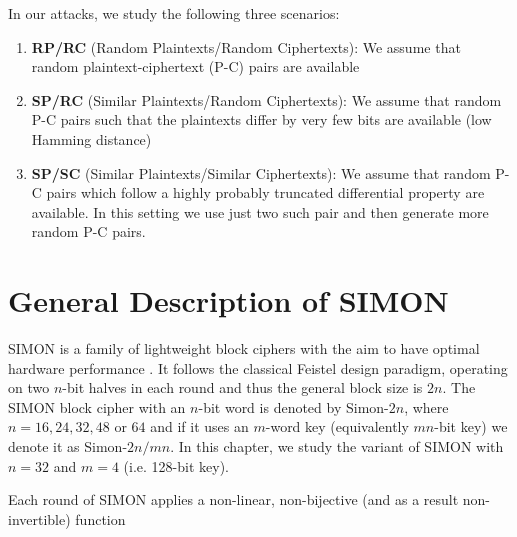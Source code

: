 In our attacks, we study the following three scenarios:

\begin{enumerate}
	\item \textbf{RP/RC} (Random Plaintexts/Random Ciphertexts): We assume that random plaintext-ciphertext (P-C) pairs are available
	\item \textbf{SP/RC} (Similar Plaintexts/Random Ciphertexts): We assume that random P-C pairs such that the plaintexts differ by very few bits
	are available (low Hamming distance)
	\item \textbf{SP/SC} (Similar Plaintexts/Similar Ciphertexts): We assume that random P-C pairs which follow a highly probably truncated differential property are available. In this setting we use just two such pair and then generate more random P-C pairs.
	
	
\end{enumerate}



\section{General Description of SIMON}

SIMON is a family of lightweight block ciphers with the aim to have optimal hardware performance \cite{NSAciphers}.
It follows the classical Feistel design paradigm, operating on two
$n$-bit halves in each round and thus the general block size is $2n$.
The SIMON block cipher with an $n$-bit word is denoted by Simon-$2n$, where
$n=16,24,32,48$ or $64$ and if it uses an $m$-word key (equivalently $mn$-bit
key) we denote it as Simon-$2n/mn$. In this chapter, we study the variant of
SIMON with $n=32$ and $m=4$ (i.e. 128-bit key).

Each round of SIMON applies a non-linear, non-bijective (and as a result
non-invertible) function


